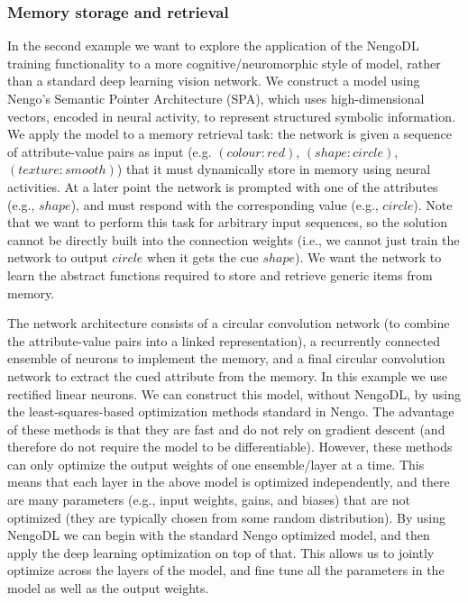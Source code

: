 \documentclass{article}
\begin{document}
\subsubsection{Memory storage and retrieval}

In the second example we want to explore the application of the NengoDL training functionality to a more cognitive/neuromorphic style of model, rather than a standard deep learning vision network.  We construct a model using Nengo's Semantic Pointer Architecture (SPA), which uses high-dimensional vectors, encoded in neural activity, to represent structured symbolic information.  We apply the model to a memory retrieval task: the network is given a sequence of attribute-value pairs as input (e.g. $(colour: red)$, $(shape: circle)$, $(texture: smooth)$) that it must dynamically store in memory using neural activities.  At a later point the network is prompted with one of the attributes (e.g., $shape$), and must respond with the corresponding value (e.g., $circle$).  Note that we want to perform this task for arbitrary input sequences, so the solution cannot be directly built into the connection weights (i.e., we cannot just train the network to output $circle$ when it gets the cue $shape$).  We want the network to learn the abstract functions required to store and retrieve generic items from memory.

The network architecture consists of a circular convolution network (to combine the attribute-value pairs into a linked representation), a recurrently connected ensemble of neurons to implement the memory, and a final circular convolution network to extract the cued attribute from the memory.  In this example we use rectified linear neurons.  We can construct this model, without NengoDL, by using the  least-squares-based optimization methods standard in Nengo.  The advantage of these methods is that they are fast and do not rely on gradient descent (and therefore do not require the model to be differentiable).  However, these methods can only optimize the output weights of one ensemble/layer at a time.  This means that each layer in the above model is optimized independently, and there are many parameters (e.g., input weights, gains, and biases) that are not optimized (they are typically chosen from some random distribution).  By using NengoDL we can begin with the standard Nengo optimized model, and then apply the deep learning optimization on top of that.  This allows us to jointly optimize across the layers of the model, and fine tune all the parameters in the model as well as the output weights.
\end{document}

